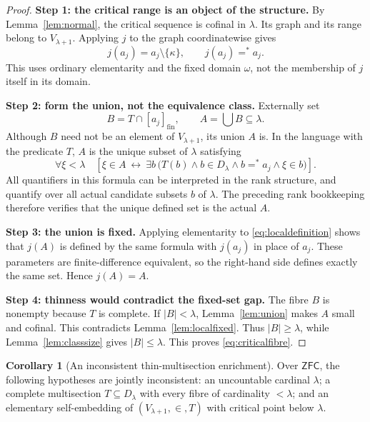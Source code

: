 \documentclass[11pt,letterpaper]{article}
\theoremstyle{definition}
\newtheorem{corollary}[definition]{Corollary}
\numberwithin{equation}{section}
\newcommand{\ZFC}{\mathsf{ZFC}}
\newcommand{\eqfin}{\mathrel{=^{*}}}
\newcommand{\cl}[1]{[#1]_{\mathrm{fin}}}
\begin{document}
\begin{proof}
\textbf{Step 1: the critical range is an object of the structure.}
By Lemma~\ref{lem:normal}, the critical sequence is cofinal in $\lambda$. Its graph and its range belong to $V_{\lambda+1}$. Applying $j$ to the graph coordinatewise gives
\[
 j(a_j)=a_j\setminus\{\kappa\},
 \qquad j(a_j)\eqfin a_j.
\]
This uses ordinary elementarity and the fixed domain $\omega$, not the membership of $j$ itself in its domain.

\textbf{Step 2: form the union, not the equivalence class.}
Externally set
\[
 B=T\cap\cl{a_j},\qquad A=\bigcup B\subseteq\lambda.
\]
Although $B$ need not be an element of $V_{\lambda+1}$, its union $A$ is. In the language with the predicate $T$, $A$ is the unique subset of $\lambda$ satisfying
\begin{equation}\label{eq:localdefinition}
 \forall\xi<\lambda\quad
 \left[\xi\in A\ \longleftrightarrow\
 \exists b\,\bigl(T(b)\wedge b\in D_\lambda
 \wedge b\eqfin a_j\wedge\xi\in b\bigr)\right].
\end{equation}
All quantifiers in this formula can be interpreted in the rank structure, and quantify over all actual candidate subsets $b$ of $\lambda$. The preceding rank bookkeeping therefore verifies that the unique defined set is the actual $A$.

\textbf{Step 3: the union is fixed.}
Applying elementarity to \eqref{eq:localdefinition} shows that $j(A)$ is defined by the same formula with $j(a_j)$ in place of $a_j$. These parameters are finite-difference equivalent, so the right-hand side defines exactly the same set. Hence $j(A)=A$.

\textbf{Step 4: thinness would contradict the fixed-set gap.}
The fibre $B$ is nonempty because $T$ is complete. If $|B|<\lambda$, Lemma~\ref{lem:union} makes $A$ small and cofinal. This contradicts Lemma~\ref{lem:localfixed}. Thus $|B|\ge\lambda$, while Lemma~\ref{lem:classsize} gives $|B|\le\lambda$. This proves \eqref{eq:criticalfibre}.
\end{proof}

\begin{corollary}[An inconsistent thin-multisection enrichment]\label{cor:I1thin}
Over $\ZFC$, the following hypotheses are jointly inconsistent: an uncountable cardinal $\lambda$; a complete multisection $T\subseteq D_\lambda$ with every fibre of cardinality $<\lambda$; and an elementary self-embedding of $(V_{\lambda+1},\in,T)$ with critical point below $\lambda$.
\end{corollary}
\end{document}
